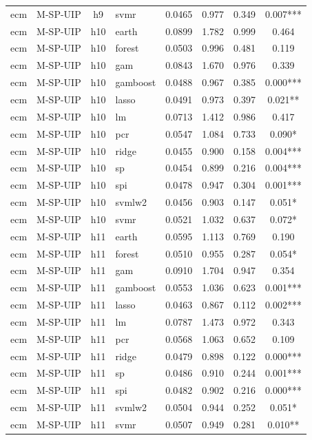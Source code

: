 \begin{ThreePartTable}
\begin{longtable}[t]{llclcccc}
ecm & M-SP-UIP & h9 & svmr & 0.0465 & 0.977 & 0.349 & 0.007***\\
\addlinespace
ecm & M-SP-UIP & h10 & earth & 0.0899 & 1.782 & 0.999 & 0.464\\
ecm & M-SP-UIP & h10 & forest & 0.0503 & 0.996 & 0.481 & 0.119\\
ecm & M-SP-UIP & h10 & gam & 0.0843 & 1.670 & 0.976 & 0.339\\
ecm & M-SP-UIP & h10 & gamboost & 0.0488 & 0.967 & 0.385 & 0.000***\\
ecm & M-SP-UIP & h10 & lasso & 0.0491 & 0.973 & 0.397 & 0.021**\\
ecm & M-SP-UIP & h10 & lm & 0.0713 & 1.412 & 0.986 & 0.417\\
ecm & M-SP-UIP & h10 & pcr & 0.0547 & 1.084 & 0.733 & 0.090*\\
ecm & M-SP-UIP & h10 & ridge & 0.0455 & 0.900 & 0.158 & 0.004***\\
ecm & M-SP-UIP & h10 & sp & 0.0454 & 0.899 & 0.216 & 0.004***\\
ecm & M-SP-UIP & h10 & spi & 0.0478 & 0.947 & 0.304 & 0.001***\\
ecm & M-SP-UIP & h10 & svmlw2 & 0.0456 & 0.903 & 0.147 & 0.051*\\
ecm & M-SP-UIP & h10 & svmr & 0.0521 & 1.032 & 0.637 & 0.072*\\
\addlinespace
ecm & M-SP-UIP & h11 & earth & 0.0595 & 1.113 & 0.769 & 0.190\\
ecm & M-SP-UIP & h11 & forest & 0.0510 & 0.955 & 0.287 & 0.054*\\
ecm & M-SP-UIP & h11 & gam & 0.0910 & 1.704 & 0.947 & 0.354\\
ecm & M-SP-UIP & h11 & gamboost & 0.0553 & 1.036 & 0.623 & 0.001***\\
ecm & M-SP-UIP & h11 & lasso & 0.0463 & 0.867 & 0.112 & 0.002***\\
ecm & M-SP-UIP & h11 & lm & 0.0787 & 1.473 & 0.972 & 0.343\\
ecm & M-SP-UIP & h11 & pcr & 0.0568 & 1.063 & 0.652 & 0.109\\
ecm & M-SP-UIP & h11 & ridge & 0.0479 & 0.898 & 0.122 & 0.000***\\
ecm & M-SP-UIP & h11 & sp & 0.0486 & 0.910 & 0.244 & 0.001***\\
ecm & M-SP-UIP & h11 & spi & 0.0482 & 0.902 & 0.216 & 0.000***\\
ecm & M-SP-UIP & h11 & svmlw2 & 0.0504 & 0.944 & 0.252 & 0.051*\\
ecm & M-SP-UIP & h11 & svmr & 0.0507 & 0.949 & 0.281 & 0.010**\\

\end{longtable}
\end{ThreePartTable}

